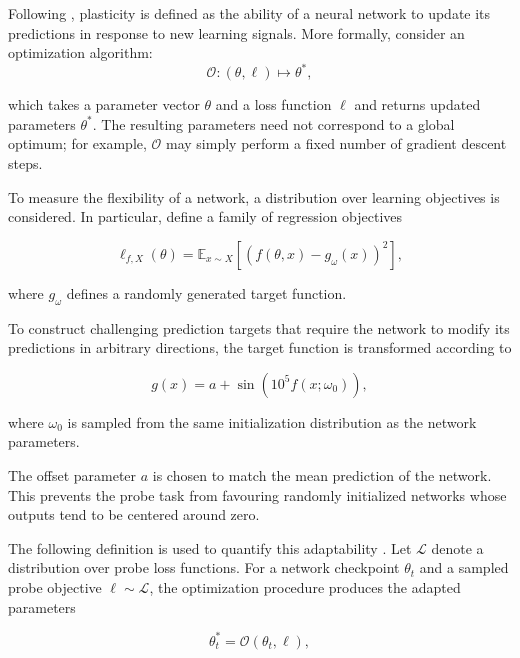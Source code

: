 Following \citep{lyle2023understanding}, plasticity is defined as the ability of a neural network to update its predictions in response to new learning signals. More formally, consider an optimization algorithm:
\begin{equation}
\mathcal{O} : (\theta,\ell) \mapsto \theta^{*},
\end{equation}

which takes a parameter vector $\theta$ and a loss function $\ell$ and returns updated parameters $\theta^{*}$. The resulting parameters need not correspond to a global optimum; for example, $\mathcal{O}$ may simply perform a fixed number of gradient descent steps.

To measure the flexibility of a network, a distribution over learning objectives is considered. In particular, \citep{lyle2023understanding} define a family of regression objectives

\begin{equation}
\ell_{f,X}(\theta)
=
\mathbb{E}_{x \sim X}
\left[
\left(
f(\theta,x)-g_{\omega}(x)
\right)^2
\right],
\end{equation}

where $g_{\omega}$ defines a randomly generated target function.

To construct challenging prediction targets that require the network to modify its predictions in arbitrary directions, the target function is transformed according to

\begin{equation}
g(x)
=
a
+
\sin
\left(
10^{5}f(x;\omega_0)
\right),
\end{equation}

where $\omega_0$ is sampled from the same initialization distribution as the network parameters.

The offset parameter $a$ is chosen to match the mean prediction of the network. This prevents the probe task from favouring randomly initialized networks whose outputs tend to be centered around zero.

The following definition is used to quantify this adaptability
\citep{lyle2023understanding}. Let $\mathcal{L}$ denote a distribution
over probe loss functions. For a network checkpoint $\theta_t$ and a
sampled probe objective $\ell \sim \mathcal{L}$, the optimization
procedure produces the adapted parameters

\begin{equation}
\theta_t^{*}
=
\mathcal{O}(\theta_t,\ell),
\end{equation}


